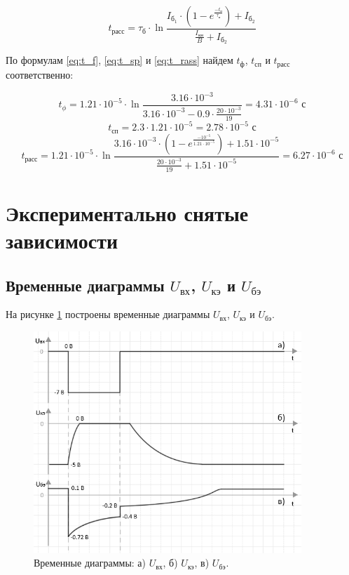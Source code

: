 \documentclass[a4paper,14pt]{extarticle}
\begin{document}
\begin{equation}\label{eq:t_rass}
t_\text{расс} = \tau_{\text{б}} \cdot \ln{\frac{I_{\text{б}_1} \cdot \left( 1 - e^{\frac{-t_\text{и}}{\tau_\text{н}}} \right) + I_{\text{б}_2}}{\frac{I_\text{кн}}{B} + I_{\text{б}_2}}}
\end{equation}

По формулам \ref{eq:t_f}, \ref{eq:t_sp} и \ref{eq:t_rass} найдем $t_\text{ф}$, $t_\text{сп}$ и $t_\text{расс}$ соответственно:

\[
t_\phi = 1.21 \cdot 10^{-5} \cdot \ln{\frac{3.16 \cdot 10^{-3}}{3.16 \cdot 10^{-3} - 0.9 \cdot \frac{20 \cdot 10^{-3}}{19}}} = 4.31 \cdot 10^{-6} \text{ с}
\]
\[
t_\text{сп} = 2.3 \cdot 1.21 \cdot 10^{-5} = 2.78 \cdot 10^{-5} \text{ с}
\]
\[
t_\text{расс} = 1.21 \cdot 10^{-5} \cdot \ln{\frac{3.16 \cdot 10^{-3} \cdot \left( 1 - e^{\frac{-10^{-5}}{1.21 \cdot 10^{-5}}} \right) + 1.51 \cdot 10^{-5}}{\frac{20 \cdot 10^{-3}}{19} + 1.51 \cdot 10^{-5}}} = 6.27 \cdot 10^{-6} \text{ с}
\]

\section{Экспериментально снятые зависимости}

\subsection{Временные диаграммы $U_\text{вх}$, $U_\text{кэ}$ и $U_\text{бэ}$}

На рисунке \ref{fig:time} построены временные диаграммы $U_\text{вх}$, $U_\text{кэ}$ и $U_\text{бэ}$.
	
\begin{figure}[H]
\begin{center}
	\includegraphics[width=0.9\textwidth]{time}
	\caption{Временные диаграммы: а) $U_\text{вх}$, б) $U_\text{кэ}$, в) $U_\text{бэ}$.}
	\label{fig:time}
\end{center}
\end{figure}
\end{document}

